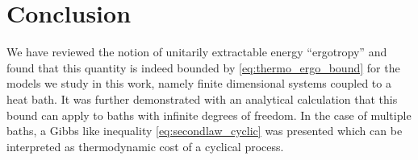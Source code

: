 
\section{Conclusion}
\label{sec:conclusion-2}

We have reviewed the notion of unitarily extractable energy
``ergotropy'' and found that this quantity is indeed bounded by
\cref{eq:thermo_ergo_bound} for the models we study in this work,
namely finite dimensional systems coupled to a heat bath. It was
further demonstrated with an analytical calculation that this bound
can apply to baths with infinite degrees of freedom. In the
case of multiple baths, a Gibbs like inequality
\cref{eq:secondlaw_cyclic} was presented which can be interpreted as
thermodynamic cost of a cyclical process.

